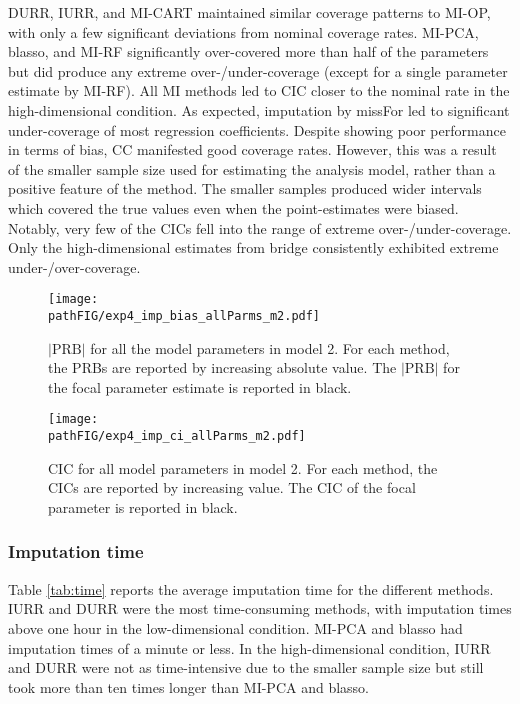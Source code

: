 	DURR, IURR, and MI-CART maintained similar coverage patterns to MI-OP, with only 
	a few significant deviations from nominal coverage rates.
	MI-PCA, blasso, and MI-RF significantly over-covered more than half of the parameters but did produce any extreme over-/under-coverage (except for a single parameter estimate by MI-RF).
	All MI methods led to CIC closer to the nominal rate in the high-dimensional condition. As expected, imputation by missFor led to significant under-coverage of most regression coefficients. 
	Despite showing poor performance in terms of bias, CC manifested good coverage rates.
	However, this was a result of the smaller sample size used for estimating the analysis model, rather than 
	a positive feature of the method.
	The smaller samples produced wider intervals which covered the true values even when the point-estimates 
	were biased. Notably, very few of the CICs fell into the range of extreme over-/under-coverage. Only the high-dimensional estimates from bridge consistently exhibited extreme under-/over-coverage.

\begin{figure}
	\centering
	\texttt{[image: \\pathFIG/exp4\_imp\_bias\_allParms\_m2.pdf]}
	\caption{
		$|\text{PRB}|$ for all the model parameters in model 2.
		For each method, the PRBs are reported by increasing absolute value.
		The $|\text{PRB}|$ for the focal parameter estimate is reported in black.
	}
		\label{fig:exp4_bias_allP}
\end{figure}

\begin{figure}
	\centering
	\texttt{[image: \\pathFIG/exp4\_imp\_ci\_allParms\_m2.pdf]}
	\caption{
		CIC for all model parameters in model 2.
		For each method, the CICs are reported by increasing value.
		The CIC of the focal parameter is reported in black.
	}
	\label{fig:exp4_ci_allP}
\end{figure}

\FloatBarrier

\subsubsection{Imputation time}

	Table \ref{tab:time} reports the average imputation time for the different methods.
	IURR and DURR were the most time-consuming methods, with imputation times above one hour 
	in the low-dimensional condition. 
	MI-PCA and blasso had imputation times of a minute or less.
	In the high-dimensional condition, IURR and DURR were not as time-intensive due to the smaller
	sample size but still took more than ten times longer than MI-PCA and blasso.

